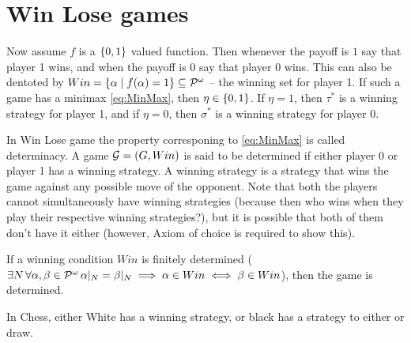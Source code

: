 \section{Win Lose games}
\label{sec:winlose}
Now assume $f$ is a $\{0,1\}$ valued function. Then whenever the payoff is $1$ say that player 1 wins, and when the payoff is $0$ say that player 0 wins. This can also be dentoted by $Win = \{ \alpha \mid f(\alpha) = 1\} \subseteq \mathcal{P}^\omega$ -- the winning set for player 1. If such a game has a minimax \eqref{eq:MinMax}, then $\eta \in \{0,1\}$. If $\eta=1$, then $\tau^*$ is a winning strategy for player 1, and if $\eta=0$, then $\sigma^*$ is a winning strategy for player 0.

In Win Lose game the property corresponing to \eqref{eq:MinMax} is called determinacy. A game $\mathcal{G}=(G,Win)$ is said to be determined if either player 0 or player 1 has a winning strategy. A winning strategy is a strategy that wins the game against any possible move of the opponent. Note that both the players cannot simultaneously have winning strategies (because then who wins when they play their respective winning strategies?), but it is possible that both of them don't have it either (however, Axiom of choice is required to show this).

\begin{corollary}
    \label{cor:finiteDeterminacy}
    If a winning condition $Win$ is finitely determined ($\exists N \, \forall \alpha,\beta \in \mathcal{P}^\omega \, \alpha|_N = \beta|_N \implies \alpha \in Win \iff \beta \in Win$), then the game is determined.
\end{corollary}

\begin{example}
    In Chess, either White has a winning strategy, or black has a strategy to either or draw.
\end{example}
